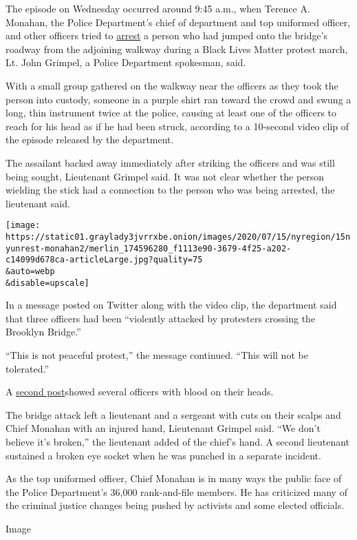 The episode on Wednesday occurred around 9:45 a.m., when Terence A.
Monahan, the Police Department's chief of department and top uniformed
officer, and other officers tried to
\href{https://www.nytimes3xbfgragh.onion/2020/07/17/us/portland-protests.html}{arrest}
a person who had jumped onto the bridge's roadway from the adjoining
walkway during a Black Lives Matter protest march, Lt. John Grimpel, a
Police Department spokesman, said.

With a small group gathered on the walkway near the officers as they
took the person into custody, someone in a purple shirt ran toward the
crowd and swung a long, thin instrument twice at the police, causing at
least one of the officers to reach for his head as if he had been
struck, according to a 10-second video clip of the episode released by
the department.

The assailant backed away immediately after striking the officers and
was still being sought, Lieutenant Grimpel said. It was not clear
whether the person wielding the stick had a connection to the person who
was being arrested, the lieutenant said.

\texttt{[image: https://static01.graylady3jvrrxbe.onion/images/2020/07/15/nyregion/15nyunrest-monahan2/merlin\_174596280\_f1113e90-3679-4f25-a202-c14099d678ca-articleLarge.jpg?quality=75\\\&auto=webp\\\&disable=upscale]}

In a message posted on Twitter along with the video clip, the department
said that three officers had been ``violently attacked by protesters
crossing the Brooklyn Bridge.''

``This is not peaceful protest,'' the message continued. ``This will not
be tolerated.''

A \href{https://twitter.com/NYPDnews/status/1283442839884627980}{second
post}showed several officers with blood on their heads.

The bridge attack left a lieutenant and a sergeant with cuts on their
scalps and Chief Monahan with an injured hand, Lieutenant Grimpel said.
``We don't believe it's broken,'' the lieutenant added of the chief's
hand. A second lieutenant sustained a broken eye socket when he was
punched in a separate incident.

As the top uniformed officer, Chief Monahan is in many ways the public
face of the Police Department's 36,000 rank-and-file members. He has
criticized many of the criminal justice changes being pushed by
activists and some elected officials.

Image

